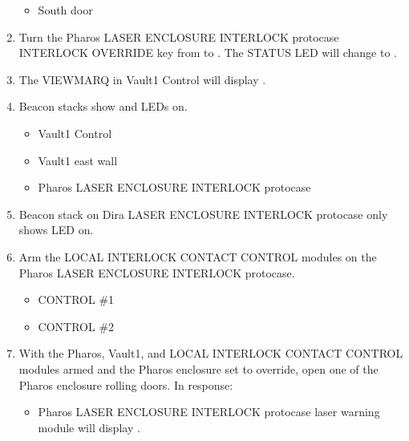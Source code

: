 \documentclass[letterpaper,10pt,english]{sphinxmanual}
\begin{document}
\begin{enumerate}
\begin{itemize}
\item {} 
\sphinxAtStartPar
South door

\end{itemize}

\item {} 
\sphinxAtStartPar
Turn the Pharos LASER ENCLOSURE INTERLOCK protocase INTERLOCK OVERRIDE key from  to .
The STATUS LED will change to .

\item {} 
\sphinxAtStartPar
The VIEWMARQ in Vault\sphinxhyphen{}1 Control will display .

\item {} 
\sphinxAtStartPar
Beacon stacks show  and  LEDs on.
\begin{itemize}
\item {} 
\sphinxAtStartPar
Vault\sphinxhyphen{}1 Control

\item {} 
\sphinxAtStartPar
Vault\sphinxhyphen{}1 east wall

\item {} 
\sphinxAtStartPar
Pharos LASER ENCLOSURE INTERLOCK protocase

\end{itemize}

\item {} 
\sphinxAtStartPar
Beacon stack on Dira LASER ENCLOSURE INTERLOCK protocase only shows  LED on.

\item {} 
\sphinxAtStartPar
Arm the LOCAL INTERLOCK CONTACT CONTROL modules on the Pharos LASER ENCLOSURE INTERLOCK protocase.
\begin{itemize}
\item {} 
\sphinxAtStartPar
CONTROL \#1

\item {} 
\sphinxAtStartPar
CONTROL \#2

\end{itemize}

\item {} 
\sphinxAtStartPar
With the Pharos, Vault\sphinxhyphen{}1, and LOCAL INTERLOCK CONTACT CONTROL modules armed and the Pharos enclosure set to override, open one of the Pharos enclosure rolling doors. In response:
\begin{itemize}
\item {} 
\sphinxAtStartPar
Pharos LASER ENCLOSURE INTERLOCK protocase laser warning module will display .


\end{itemize}
\end{enumerate}
\end{document}
